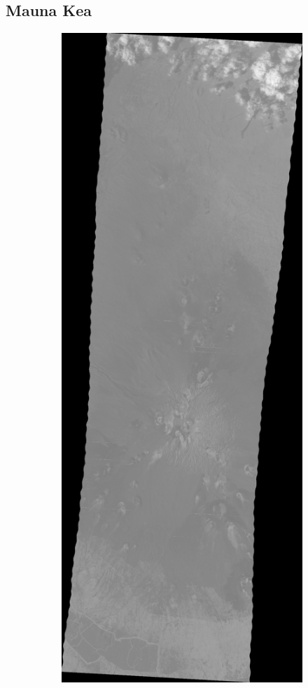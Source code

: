 \newpage
\subsection{Mauna Kea}

\begin{figure}[H]
\centering
\begin{subfigure}{.5\textwidth}
  \centering
  \includegraphics[scale=0.14]{images/mauna_kea_raw_sum.png}

\end{subfigure}
\end{figure}
